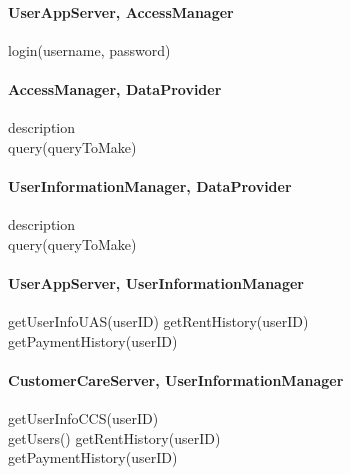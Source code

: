 \paragraph{UserAppServer, AccessManager}
login(username, password) %

\paragraph{AccessManager, DataProvider} 
description \\
query(queryToMake)

\paragraph{UserInformationManager, DataProvider} 
description \\
query(queryToMake)

\paragraph{UserAppServer, UserInformationManager}
getUserInfoUAS(userID)
getRentHistory(userID) \\
getPaymentHistory(userID) \\

\paragraph{CustomerCareServer, UserInformationManager}
getUserInfoCCS(userID) \\
getUsers()
getRentHistory(userID) \\
getPaymentHistory(userID) \\










